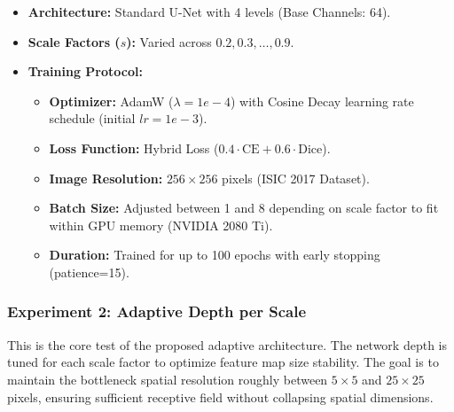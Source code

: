 \begin{itemize} 
    \item \textbf{Architecture:} Standard U-Net with 4 levels (Base Channels: 64). 
    \item \textbf{Scale Factors ($s$):} Varied across ${0.2, 0.3, \dots, 0.9}$. 
    \item \textbf{Training Protocol:} 
    \begin{itemize} 
        \item \textbf{Optimizer:} AdamW ($\lambda=1e-4$) with Cosine Decay learning rate schedule (initial $lr=1e-3$). 
        \item \textbf{Loss Function:} Hybrid Loss ($0.4 \cdot \text{CE} + 0.6 \cdot \text{Dice}$). 
        \item \textbf{Image Resolution:} $256 \times 256$ pixels (ISIC 2017 Dataset). 
        \item \textbf{Batch Size:} Adjusted between 1 and 8 depending on scale factor to fit within GPU memory (NVIDIA 2080 Ti). \item \textbf{Duration:} Trained for up to 100 epochs with early stopping (patience=15). 
    \end{itemize} 
\end{itemize}


\subsubsection{Experiment 2: Adaptive Depth per Scale} This is the core test of the proposed adaptive architecture. The network depth is tuned for each scale factor to optimize feature map size stability. The goal is to maintain the bottleneck spatial resolution roughly between $5 \times 5$ and $25 \times 25$ pixels, ensuring sufficient receptive field without collapsing spatial dimensions. 

